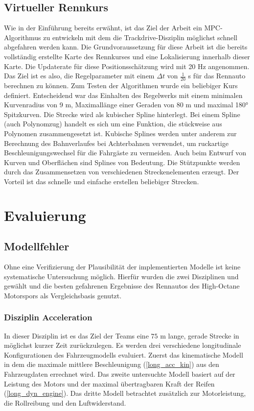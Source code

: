 \documentclass{like}
\begin{document}
\section{Virtueller Rennkurs}
Wie in der Einführung bereits erwähnt, ist das Ziel der Arbeit ein \ac{MPC}-Algorithmus zu entwickeln mit dem die Trackdrive-Disziplin möglichst schnell abgefahren werden kann. Die Grundvoraussetzung für diese Arbeit ist die bereits vollständig erstellte Karte des Rennkurses und eine Lokalisierung innerhalb dieser Karte. Die Updaterate für diese Positionsschätzung wird mit 20 Hz angenommen. Das Ziel ist es also, die Regelparameter mit einem $\Delta t$ von $\frac{1}{20}$ s für das Rennauto berechnen zu können. Zum Testen der Algorithmen wurde ein beliebiger Kurs definiert. Entscheidend war das Einhalten des Regelwerks mit einem minimalen Kurvenradius von 9 m, Maximallänge einer Geraden von 80 m und maximal 180° Spitzkurven. Die Strecke wird als kubischer Spline hinterlegt. Bei einem Spline (auch Polynomzug) handelt es sich um eine Funktion, die stückweise aus Polynomen zusammengesetzt ist. Kubische Splines werden unter anderem zur Berechnung des Bahnverlaufes bei Achterbahnen verwendet, um ruckartige Beschleunigungswechsel für die Fahrgäste zu vermeiden. Auch beim Entwurf von Kurven und Oberflächen sind Splines von Bedeutung. Die Stützpunkte werden durch das Zusammensetzen von ver\-schie\-den\-en Streckenelementen erzeugt. Der Vorteil ist das schnelle und einfache erstellen beliebiger Strecken. 

\chapter{Evaluierung}
\section{Modellfehler}
\label{modelError}
Ohne eine Verifizierung der Plausibilität der implementierten Modelle ist keine sys\-te\-ma\-tische Untersuchung möglich. Hierfür wurden die zwei Disziplinen  und  gewählt und die besten gefahrenen Ergebnisse des Rennautos des High-Octane Motorspors als Vergleichsbasis genutzt.


\subsection{Disziplin Acceleration}
In dieser Disziplin ist es das Ziel der Teams eine $75$ m lange, gerade Strecke in möglichst kurzer Zeit zurückzulegen.
Es werden drei verschiedene longitudinale Konfigurationen des Fahrzeugmodells evaluiert. Zuerst das kinematische Modell in dem die maximale mittlere Beschleunigung (\ref{long_acc_kin}) aus den Fahrzeugdaten errechnet wird. Das zweite untersuchte Modell basiert auf der Leistung des Motors und der maximal übertragbaren Kraft der Reifen (\ref{long_dyn_engine}).
Das dritte Modell betrachtet zusätzlich zur Motorleistung, die Rollreibung und den Luftwiderstand. 
\end{document}
